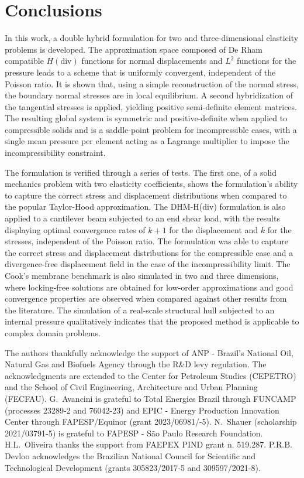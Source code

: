 \documentclass[english,11pt,3p,number,sort&compress]{elsarticle}
\begin{document}
\section{Conclusions} \label{sec:conclusions}

In this work, a double hybrid formulation for two and three-dimensional elasticity problems is developed. The approximation space composed of De Rham compatible $H(\text{div})$ functions for normal displacements and $L^2$ functions for the pressure leads to a scheme that is uniformly convergent, independent of the Poisson ratio. It is shown that, using a simple reconstruction of the normal stress, the boundary normal stresses are in local equilibrium.
A second hybridization of the tangential stresses is applied, yielding positive semi-definite element matrices. The resulting global system is symmetric and positive-definite when applied to compressible solids and is a saddle-point problem for incompressible cases, with a single mean pressure per element acting as a Lagrange multiplier to impose the incompressibility constraint.


The formulation is verified through a series of tests. The first one, of a solid mechanics problem with two elasticity coefficients, shows the formulation's ability to capture the correct stress and displacement distributions when compared to the popular Taylor-Hood approximation. The DHM-H(div) formulation is also applied to a cantilever beam subjected to an end shear load, with the results displaying optimal convergence rates of $k+1$ for the displacement and $k$ for the stresses, independent of the Poisson ratio. The formulation was able to capture the correct stress and displacement distributions for the compressible case and a divergence-free displacement field in the case of the incompressibility limit. The Cook's membrane benchmark is also simulated in two and three dimensions, where locking-free solutions are obtained for low-order approximations and good convergence properties are observed when compared against other results from the literature. The simulation of a real-scale structural hull subjected to an internal pressure qualitatively indicates that the proposed method is applicable to complex domain problems.

\bigskip{} The authors thankfully acknowledge the support of ANP - Brazil's National Oil, Natural Gas and Biofuels Agency through the R\&D levy regulation. The acknowledgments are extended to the Center for Petroleum Studies (CEPETRO) and the School of Civil Engineering, Architecture and Urban Planning (FECFAU). G.~Avancini is grateful to Total Energies Brazil through FUNCAMP (processes 23289-2 and 76042-23) and EPIC - Energy Production Innovation Center through FAPESP/Equinor (grant 2023/06981/-5). N.~Shauer (scholarship 2021/03791-5) is grateful to FAPESP - S\~ao Paulo Research Foundation. H.L.~Oliveira thanks the support from FAEPEX PIND grant n. 519.287. P.R.B.~ Devloo acknowledges the Brazilian National Council for Scientific and Technological Development (grants 305823/2017-5 and 309597/2021-8).

%


\end{document}
